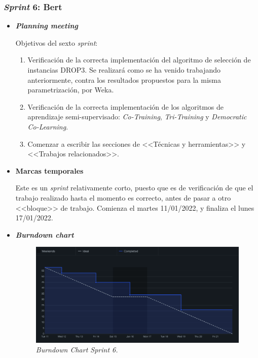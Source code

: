 \subsubsection{\textit{Sprint} 6: Bert}
\begin{itemize}
\item \textbf{\textit{Planning meeting}}

Objetivos del sexto \textit{sprint}:
\begin{enumerate}
\item Verificación de la correcta implementación del algoritmo de selección de instancias DROP3. Se realizará como se ha venido trabajando anteriormente, contra los resultados propuestos para la misma parametrización, por Weka.
\item Verificación de la correcta implementación de los algoritmos de aprendizaje semi-supervisado: \textit{Co-Training}, \textit{Tri-Training} y \textit{Democratic Co-Learning}.
\item Comenzar a escribir las secciones de <<Técnicas y herramientas>> y <<Trabajos relacionados>>.
\end{enumerate}
\item \textbf{Marcas temporales}

Este es un \textit{sprint} relativamente corto, puesto que es de verificación de que el trabajo realizado hasta el momento es correcto, antes de pasar a otro <<bloque>> de trabajo. Comienza el martes 11/01/2022, y finaliza el lunes 17/01/2022.

\item \textbf{\textit{Burndown chart}}
\begin{figure}
\begin{center}
\includegraphics[width=\textwidth]{../img/anexos/sprints/BD-Sprint6}
\caption{\textit{Burndown Chart Sprint 6.}}\label{fig:BD-Sprint6}
\end{center}
\end{figure}


\end{itemize}
